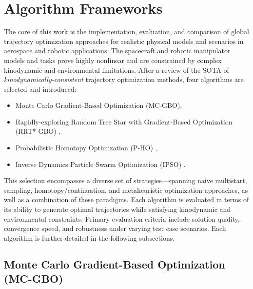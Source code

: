 \section{Algorithm Frameworks}
\label{sec:algorithm_frameworks}
The core of this work is the implementation, evaluation, and comparison of global trajectory optimization approaches for realistic physical models and scenarios in aerospace and robotic applications.
The spacecraft and robotic manipulator models and tasks prove highly nonlinear and are constrained by complex kinodynamic and environmental limitations.
After a review of the \ac{SOTA} of \emph{kinodynamically-consistent} trajectory optimization methods, four algorithms are selected and introduced: 
\begin{itemize}
    \item Monte Carlo Gradient-Based Optimization (MC-GBO),
    \item Rapidly-exploring Random Tree Star with Gradient-Based Optimization (RRT*-GBO) \cite{Stoneman14},
    \item Probabilistic Homotopy Optimization (P-HO) \cite{Pardis24},
    \item Inverse Dynamics Particle Swarm Optimization (IPSO) \cite{Spiller16,Spiller18}.
\end{itemize}
This selection encompasses a diverse set of strategies---spanning naive multistart, sampling, homotopy/continuation, and metaheuristic optimization approaches, as well as a combination of these paradigms.
Each algorithm is evaluated in terms of its ability to generate optimal trajectories while satisfying kinodynamic and environmental constraints.
Primary evaluation criteria include solution quality, convergence speed, and robustness under varying test case scenarios.
Each algorithm is further detailed in the following subsections.

\subsection{Monte Carlo Gradient-Based Optimization (MC-GBO)}

